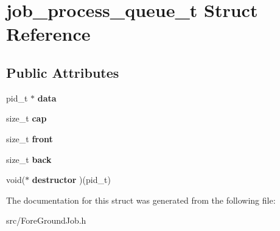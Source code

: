 \hypertarget{structjob__process__queue__t}{\section{job\-\_\-process\-\_\-queue\-\_\-t Struct Reference}
\label{structjob__process__queue__t}
}
\subsection*{Public Attributes}
\begin{DoxyCompactItemize}
\item 
\hypertarget{structjob__process__queue__t_ab4d2d38e54ca833f6dbd03a16cb55b1c}{pid\-\_\-t $\ast$ {\bfseries data}}\label{structjob__process__queue__t_ab4d2d38e54ca833f6dbd03a16cb55b1c}

\item 
\hypertarget{structjob__process__queue__t_a9d16c5591777171987def9d6111d3952}{size\-\_\-t {\bfseries cap}}\label{structjob__process__queue__t_a9d16c5591777171987def9d6111d3952}

\item 
\hypertarget{structjob__process__queue__t_a8dab00c5af414cc43bad3860111f6a25}{size\-\_\-t {\bfseries front}}\label{structjob__process__queue__t_a8dab00c5af414cc43bad3860111f6a25}

\item 
\hypertarget{structjob__process__queue__t_aa898a455c9afca97f157e7afd44ec94d}{size\-\_\-t {\bfseries back}}\label{structjob__process__queue__t_aa898a455c9afca97f157e7afd44ec94d}

\item 
\hypertarget{structjob__process__queue__t_afcb0c8048088787015fae69d3b12a0a9}{void($\ast$ {\bfseries destructor} )(pid\-\_\-t)}\label{structjob__process__queue__t_afcb0c8048088787015fae69d3b12a0a9}

\end{DoxyCompactItemize}


The documentation for this struct was generated from the following file\-:\begin{DoxyCompactItemize}
\item 
src/Fore\-Ground\-Job.\-h\end{DoxyCompactItemize}
